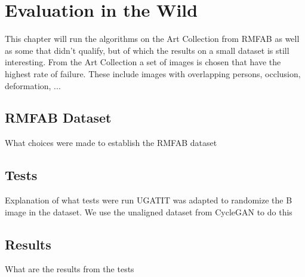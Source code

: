 \chapter{Evaluation in the Wild}
This chapter will run the algorithms on the Art Collection from \gls{RMFAB}
as well as some that didn't qualify, but of which the results on a small dataset is still interesting.
From the Art Collection a set of images is chosen that have the highest rate of failure.
These include images with overlapping persons, occlusion, deformation, ...

\section{RMFAB Dataset}
What choices were made to establish the RMFAB dataset

\section{Tests}

Explanation of what tests were run
UGATIT was adapted to randomize the B image in the dataset.
We use the unaligned dataset from CycleGAN to do this

\section{Results}
What are the results from the tests